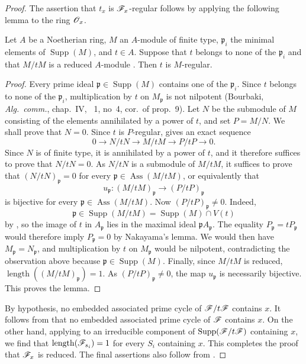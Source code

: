 \begin{proof}
The assertion that $t_x$ is $\mathscr{F}_x$-regular follows by applying the following lemma to the ring $\mathscr{O}_x$.

\begin{lemma}[3.4.6.1]
\label{IV.3.4.6.1}
Let $A$ be a Noetherian ring, $M$ an $A$-module of finite type, $\mathfrak p_i$ the minimal elements of $\operatorname{Supp}(M)$, and $t\in A$.
Suppose that $t$ belongs to none of the $\mathfrak p_i$ and that $M/tM$ is a reduced $A$-module .
Then $t$ is $M$-regular.
\end{lemma}

\begin{proof}
Every prime ideal $\mathfrak p\in\operatorname{Supp}(M)$ contains one of the $\mathfrak p_i$.
Since $t$ belongs to none of the $\mathfrak p_i$, multiplication by $t$ on $M_{\mathfrak p}$ is not nilpotent (Bourbaki, \emph{Alg.\ comm.}, chap.~IV, \textsection~1, no~4, cor.\ of prop.~9).
Let $N$ be the submodule of $M$ consisting of the elements annihilated by a power of $t$, and set $P=M/N$.
We shall prove that $N=0$.
Since $t$ is $P$-regular,  gives an exact sequence
\[
0\longrightarrow N/tN
 \longrightarrow M/tM
 \longrightarrow P/tP
 \longrightarrow 0.
\]
Since $N$ is of finite type, it is annihilated by a power of $t$, and it therefore suffices to prove that $N/tN=0$.
As $N/tN$ is a submodule of $M/tM$, it suffices to prove that $(N/tN)_{\mathfrak p}=0$ for every $\mathfrak p\in\operatorname{Ass}(M/tM)$, or equivalently that
\[
u_{\mathfrak p}:(M/tM)_{\mathfrak p}\longrightarrow(P/tP)_{\mathfrak p}
\]
is bijective for every $\mathfrak p\in\operatorname{Ass}(M/tM)$.
Now $(P/tP)_{\mathfrak p}\neq 0$.
Indeed,
\[
\mathfrak p\in\operatorname{Supp}(M/tM)
  =\operatorname{Supp}(M)\cap V(t)
\]
by , so the image of $t$ in $A_{\mathfrak p}$ lies in the maximal ideal $\mathfrak pA_{\mathfrak p}$.
The equality $P_{\mathfrak p}=tP_{\mathfrak p}$ would therefore imply $P_{\mathfrak p}=0$ by Nakayama's lemma.
We would then have $M_{\mathfrak p}=N_{\mathfrak p}$, and multiplication by $t$ on $M_{\mathfrak p}$ would be nilpotent, contradicting the observation above because $\mathfrak p\in\operatorname{Supp}(M)$.
Finally, since $M/tM$ is reduced, $\operatorname{length}((M/tM)_{\mathfrak p})=1$.
As $(P/tP)_{\mathfrak p}\neq 0$, the map $u_{\mathfrak p}$ is necessarily bijective.
This proves the lemma.
\end{proof}

By hypothesis, no embedded associated prime cycle of $\mathscr{F}/t\mathscr{F}$ contains $x$.
It follows from  that no embedded associated prime cycle of $\mathscr{F}$ contains $x$.
On the other hand, applying  to an irreducible component of $\operatorname{Supp}(\mathscr{F}/t\mathscr{F})$ containing $x$, we find that $\operatorname{length}(\mathscr{F}_{s_i})=1$ for every $S_i$ containing $x$.
This completes the proof that $\mathscr{F}_x$ is reduced.
The final assertions also follow from .
\end{proof}

